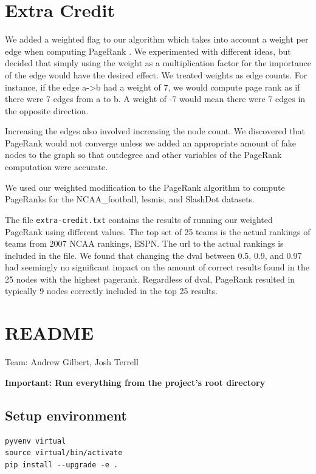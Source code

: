 \documentclass{report}
\newcommand{\pagerank}{PageRank }
\newcommand{\pageranks}{PageRanks }
\begin{document}
\section{Extra Credit}
We added a weighted flag to our algorithm which takes into account a weight per
edge when computing \pagerank. We experimented with different ideas, but decided
that simply using the weight as a multiplication factor for the importance of
the edge would have the desired effect. We treated weights as edge counts.  For
instance, if the edge a->b had a weight of 7, we would compute page rank as if
there were 7 edges from a to b. A weight of -7 would mean there were 7 edges in
the opposite direction.

Increasing the edges also involved increasing the node count. We discovered that
\pagerank would not converge unless we added an appropriate amount of fake nodes
to the graph so that outdegree and other variables of the \pagerank computation
were accurate.

We used our weighted modification to the \pagerank algorithm to compute \pageranks
for the NCAA\_football, lesmis, and SlashDot datasets.

The file \texttt{extra-credit.txt} contains the results of running our weighted
\pagerank using different  values. The top set of 25 teams is the
actual rankings of teams from 2007 NCAA rankings, ESPN. The url to the actual
rankings is included in the file. We found that changing the dval between 0.5,
0.9, and 0.97 had seemingly no significant impact on the amount of correct
results found in the 25 nodes with the highest pagerank. Regardless of dval,
\pagerank resulted in typically 9 nodes correctly included in the top 25
results.


\appendix

\section{README}
\lstset{language=bash}
Team: Andrew Gilbert, Josh Terrell

\textbf{Important: Run everything from the project's root directory}

\subsection{Setup environment}
\begin{lstlisting}
pyvenv virtual
source virtual/bin/activate
pip install --upgrade -e .
\end{lstlisting}
\end{document}
